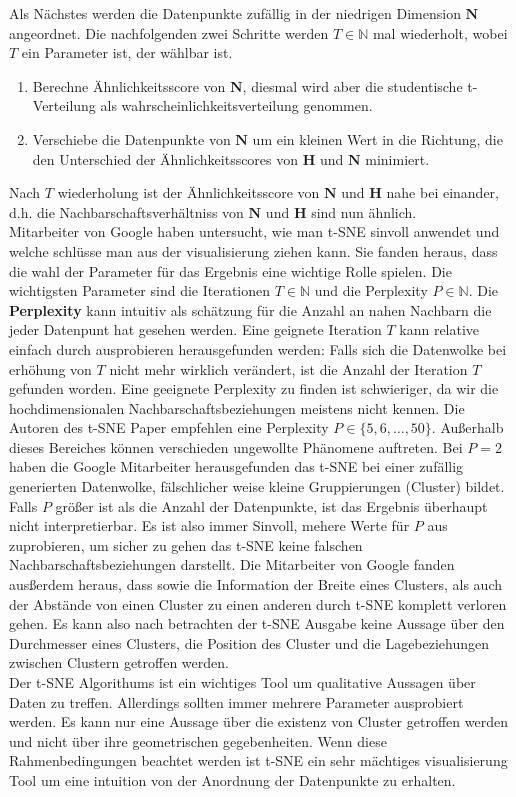 \documentclass[12pt,letterpaper,ngerman]{article}
\begin{document}
Als Nächstes werden die Datenpunkte zufällig in der niedrigen Dimension $\mathbf{N}$
angeordnet. Die nachfolgenden zwei Schritte werden $T\in \mathbb{N}$ 
mal wiederholt, wobei $T$ ein Parameter ist, der wählbar ist.
\begin{enumerate}
  \item Berechne Ähnlichkeitsscore von $\mathbf{N}$, diesmal wird aber die
      studentische t-Verteilung als wahrscheinlichkeitsverteilung genommen. 
  \item Verschiebe die Datenpunkte von $\mathbf{N}$ um ein kleinen Wert in
    die Richtung, die den Unterschied der Ähnlichkeitsscores von $\mathbf{H}$
    und $\mathbf{N}$ minimiert.
\end{enumerate}
Nach $T$ wiederholung ist der Ähnlichkeitsscore von $\mathbf{N}$ und $\mathbf{H}$
nahe bei einander, d.h. die Nachbarschaftsverhältniss von $\mathbf{N}$ und 
$\mathbf{H}$ sind nun ähnlich.\\
Mitarbeiter von Google haben untersucht, wie man t-SNE sinvoll anwendet und
welche schlüsse man aus der visualisierung ziehen kann. Sie fanden heraus,
dass die wahl der Parameter für das Ergebnis eine wichtige Rolle spielen.
Die wichtigsten Parameter sind die Iterationen $T\in \mathbb{N}$ und die
Perplexity $P \in \mathbb{N}$. Die {\bf Perplexity} kann intuitiv als schätzung 
für die Anzahl an nahen Nachbarn die jeder Datenpunt hat gesehen werden.
Eine geignete Iteration $T$ kann relative einfach durch ausprobieren 
herausgefunden werden: Falls sich die Datenwolke bei erhöhung von $T$
nicht mehr wirklich verändert, ist die Anzahl der Iteration $T$ gefunden
worden. Eine geeignete Perplexity zu finden ist schwieriger, da wir die
hochdimensionalen Nachbarschaftsbeziehungen meistens nicht kennen. Die Autoren
des t-SNE Paper empfehlen eine Perplexity $P \in \{5,6, \dots, 50\}$. Außerhalb
dieses Bereiches können verschieden ungewollte Phänomene auftreten. Bei $P=2$
haben die Google Mitarbeiter herausgefunden das t-SNE bei einer zufällig generierten
Datenwolke, fälschlicher weise kleine Gruppierungen (Cluster) bildet. Falls
$P$ größer ist als die Anzahl der Datenpunkte, ist das Ergebnis überhaupt nicht
interpretierbar. Es ist also immer Sinvoll, mehere Werte für $P$ aus zuprobieren,
um sicher zu gehen das t-SNE keine falschen Nachbarschaftsbeziehungen darstellt.
Die Mitarbeiter von Google fanden ausßerdem heraus, dass sowie die Information 
der Breite eines Clusters, als auch der Abstände von einen Cluster zu einen anderen 
durch t-SNE komplett verloren gehen. Es kann also nach betrachten der
t-SNE Ausgabe keine Aussage über den Durchmesser eines Clusters, die Position
des Cluster und die Lagebeziehungen zwischen Clustern getroffen werden. \\
Der t-SNE Algorithums ist ein wichtiges Tool um qualitative Aussagen über 
Daten zu treffen. Allerdings sollten immer mehrere Parameter ausprobiert werden.
Es kann nur eine Aussage über die existenz von Cluster getroffen werden und 
nicht über ihre geometrischen gegebenheiten. Wenn diese Rahmenbedingungen 
beachtet werden ist t-SNE ein sehr mächtiges visualisierung Tool um eine 
intuition von der Anordnung der Datenpunkte zu erhalten.
\end{document}
